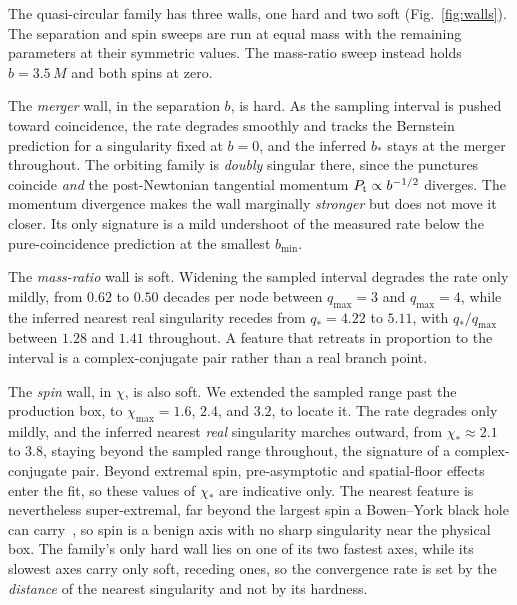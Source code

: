 \documentclass[
  aps,
  prd,
  twocolumn,
  10pt,
  amsmath,
  amssymb,
  nofootinbib,
  superscriptaddress,
  floatfix,
]{revtex4-2}
\begin{document}
The quasi-circular family has three walls, one hard and two soft
(Fig.~\ref{fig:walls}).
The separation and spin sweeps are run at equal mass with the remaining parameters at their symmetric values.
The mass-ratio sweep instead holds $b=3.5\,M$ and both spins at zero.

The \emph{merger} wall, in the separation $b$, is hard.
As the sampling interval is pushed toward coincidence, the rate degrades smoothly and tracks the Bernstein prediction for a singularity fixed at $b=0$, and the inferred $b_\ast$ stays at the merger throughout.
The orbiting family is \emph{doubly} singular there, since the punctures coincide \emph{and} the post-Newtonian tangential momentum $P_{\rm t}\propto b^{-1/2}$ diverges.
The momentum divergence makes the wall marginally \emph{stronger} but does not move it closer. Its only signature is a mild undershoot of the measured rate below the pure-coincidence prediction at the smallest $b_{\min}$.

The \emph{mass-ratio} wall is soft. Widening the sampled interval degrades the rate
only mildly, from $0.62$ to $0.50$ decades per node between $q_{\max}=3$ and
$q_{\max}=4$, while the inferred nearest real singularity recedes from
$q_\ast=4.22$ to $5.11$, with $q_\ast/q_{\max}$ between $1.28$ and $1.41$ throughout. A
feature that retreats in proportion to the interval is a complex-conjugate pair
rather than a real branch point.

The \emph{spin} wall, in $\chi$, is also soft.
We extended the sampled range past the production box, to $\chi_{\max}=1.6$, $2.4$, and $3.2$, to locate it.
The rate degrades only mildly, and the inferred nearest \emph{real} singularity marches outward, from $\chi_\ast\approx2.1$ to $3.8$, staying beyond the sampled range throughout, the signature of a complex-conjugate pair.
Beyond extremal spin, pre-asymptotic and spatial-floor effects enter the fit, so these values of $\chi_\ast$ are indicative only.
The nearest feature is nevertheless super-extremal, far beyond the largest spin a
Bowen--York black hole can carry~\cite{CookYork1990,Lovelace2008}, so spin is a benign axis with no sharp
singularity near the physical box. The family's
only hard wall lies on one of its two fastest axes, while its slowest axes carry
only soft, receding ones, so the convergence rate is set by
the \emph{distance} of the nearest singularity and not by its hardness.
\end{document}
